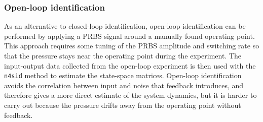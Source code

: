 \documentclass[12pt,a4paper]{article}
\begin{document}
\subsubsection{Open-loop identification}
As an alternative to closed-loop identification, open-loop identification can be performed by applying a PRBS signal around a manually found operating point. This approach requires some tuning of the PRBS amplitude and switching rate so that the pressure stays near the operating point during the experiment. The input-output data collected from the open-loop experiment is then used with the \texttt{n4sid} method to estimate the state-space matrices. Open-loop identification avoids the correlation between input and noise that feedback introduces, and therefore gives a more direct estimate of the system dynamics, but it is harder to carry out because the pressure drifts away from the operating point without feedback.
\end{document}
